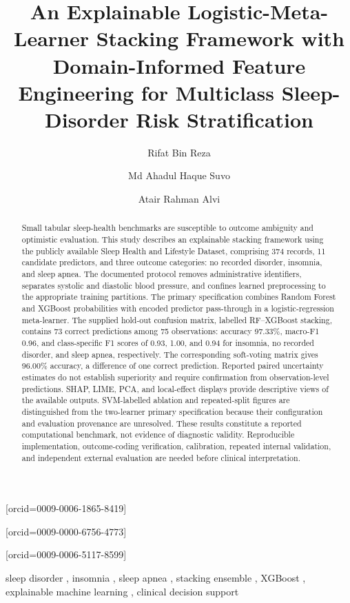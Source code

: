 \documentclass[a4paper,fleqn]{cas-dc}
\begin{document}
\raggedbottom
{}
\title[mode=title]{An Explainable Logistic-Meta-Learner Stacking Framework with Domain-Informed Feature Engineering for Multiclass Sleep-Disorder Risk Stratification}
\author[1]{Rifat Bin Reza}[orcid=0009-0006-1865-8419]
\cormark[1]
\author[2]{Md Ahadul Haque Suvo}[orcid=0009-0000-6756-4773]
\author[1]{Atair Rahman Alvi}[orcid=0009-0006-5117-8599]
\address[1]{BSRM School of Engineering, Department of Electrical and Electronics Engineering, Brac University, Dhaka, Bangladesh\label{affa}}
\address[2]{Aviation and Aerospace University, Department of Avionics Engineering, Dhaka, Bangladesh}
\begin{abstract}
Small tabular sleep-health benchmarks are susceptible to outcome ambiguity and optimistic evaluation. This study describes an explainable stacking framework using the publicly available Sleep Health and Lifestyle Dataset, comprising 374 records, 11 candidate predictors, and three outcome categories: no recorded disorder, insomnia, and sleep apnea. The documented protocol removes administrative identifiers, separates systolic and diastolic blood pressure, and confines learned preprocessing to the appropriate training partitions. The primary specification combines Random Forest and XGBoost probabilities with encoded predictor pass-through in a logistic-regression meta-learner. The supplied hold-out confusion matrix, labelled RF--XGBoost stacking, contains 73 correct predictions among 75 observations: accuracy 97.33\%, macro-F1 0.96, and class-specific F1 scores of 0.93, 1.00, and 0.94 for insomnia, no recorded disorder, and sleep apnea, respectively. The corresponding soft-voting matrix gives 96.00\% accuracy, a difference of one correct prediction. Reported paired uncertainty estimates do not establish superiority and require confirmation from observation-level predictions. SHAP, LIME, PCA, and local-effect displays provide descriptive views of the available outputs. SVM-labelled ablation and repeated-split figures are distinguished from the two-learner primary specification because their configuration and evaluation provenance are unresolved. These results constitute a reported computational benchmark, not evidence of diagnostic validity. Reproducible implementation, outcome-coding verification, calibration, repeated internal validation, and independent external evaluation are needed before clinical interpretation.
\end{abstract}
\begin{keywords}
sleep disorder \sep
insomnia \sep
sleep apnea \sep
stacking ensemble \sep
XGBoost \sep
explainable machine learning \sep
clinical decision support
\end{keywords}
\maketitle
\enlargethispage{1pt}
\end{document}
